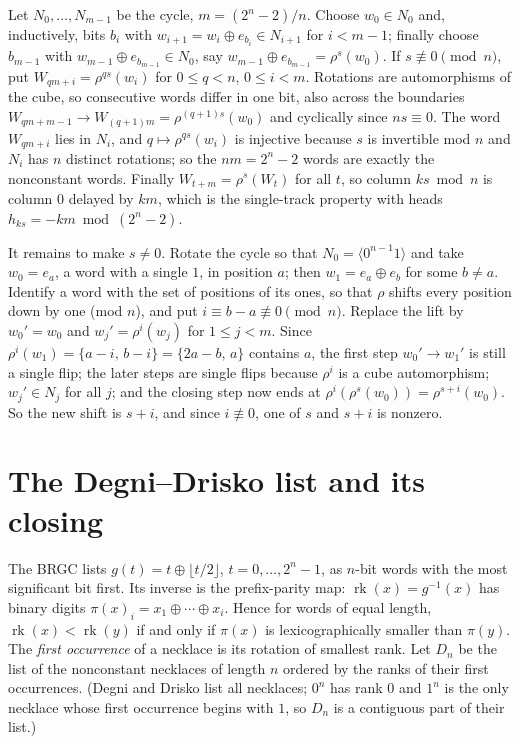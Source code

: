 \documentclass[journal,onecolumn,11pt]{IEEEtran}
\newcommand{\rk}{\operatorname{rk}}
\begin{document}
\begin{IEEEproof}
Let $N_0,\dots,N_{m-1}$ be the cycle, $m=(2^n-2)/n$. Choose $w_0\in N_0$ and, inductively, bits $b_i$ with
$w_{i+1}=w_i\oplus e_{b_i}\in N_{i+1}$ for $i<m-1$; finally choose $b_{m-1}$ with $w_{m-1}\oplus e_{b_{m-1}}\in N_0$,
say $w_{m-1}\oplus e_{b_{m-1}}=\rho^s(w_0)$. If $s\not\equiv 0\pmod n$, put $W_{qm+i}=\rho^{qs}(w_i)$ for
$0\le q<n$, $0\le i<m$. Rotations are automorphisms of the cube, so consecutive words differ in one bit, also across
the boundaries $W_{qm+m-1}\to W_{(q+1)m}=\rho^{(q+1)s}(w_0)$ and cyclically since $ns\equiv 0$. The word $W_{qm+i}$
lies in $N_i$, and $q\mapsto\rho^{qs}(w_i)$ is injective because $s$ is invertible mod $n$ and $N_i$ has $n$ distinct
rotations; so the $nm=2^n-2$ words are exactly the nonconstant words. Finally $W_{t+m}=\rho^{s}(W_t)$ for all $t$,
so column $ks \bmod n$ is column $0$ delayed by $km$, which is the single-track property with heads
$h_{ks}=-km \bmod (2^n-2)$.

It remains to make $s\ne 0$. Rotate the cycle so that $N_0=\langle 0^{n-1}1\rangle$ and take $w_0=e_a$, a word with a
single $1$, in position $a$; then $w_1=e_a\oplus e_b$ for some $b\ne a$. Identify a word with the set of positions of
its ones, so that $\rho$ shifts every position down by one (mod $n$), and put $i\equiv b-a\not\equiv 0\pmod n$. Replace
the lift by $w_0'=w_0$ and $w_j'=\rho^{i}(w_j)$ for $1\le j<m$. Since $\rho^i(w_1)=\{a-i,\,b-i\}=\{2a-b,\,a\}$
contains $a$, the first step $w_0'\to w_1'$ is still a single flip; the later steps are single flips because $\rho^i$ is
a cube automorphism; $w_j'\in N_j$ for all $j$; and the closing step now ends at $\rho^{i}(\rho^{s}(w_0))=
\rho^{s+i}(w_0)$. So the new shift is $s+i$, and since $i\not\equiv0$, one of $s$ and $s+i$ is nonzero.
\end{IEEEproof}

\section{The Degni--Drisko list and its closing}\label{sec:closing}

The BRGC lists $g(t)=t\oplus\lfloor t/2\rfloor$, $t=0,\dots,2^n-1$, as $n$-bit words with the most significant bit
first. Its inverse is the prefix-parity map: $\rk(x)=g^{-1}(x)$ has binary digits $\pi(x)_i=x_1\oplus\cdots\oplus x_i$.
Hence for words of equal length, $\rk(x)<\rk(y)$ if and only if $\pi(x)$ is lexicographically smaller than $\pi(y)$.
The \emph{first occurrence} of a necklace is its rotation of smallest rank. Let $D_n$ be the list of the nonconstant
necklaces of length $n$ ordered by the ranks of their first occurrences. (Degni and Drisko list all necklaces; $0^n$
has rank $0$ and $1^n$ is the only necklace whose first occurrence begins with $1$, so $D_n$ is a contiguous part of
their list.)
\end{document}
